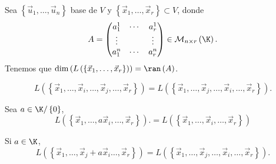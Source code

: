 Sea $\displaystyle \left\{ \vec{u}_{1}, \ldots, \vec{u}_{n}\right\}  $ base de $\displaystyle V $ y $\displaystyle \left\{ \vec{x}_{1}, \ldots, \vec{x}_{r}\right\} \subset V $, donde 
\[A = \begin{pmatrix} a^{1}_{1} & \cdots & a^{1}_{r} \\
\vdots & & \vdots \\
a^{n}_{1} & \cdots & a^{n}_{r}\end{pmatrix} \in \mathcal{M}_{n \times r}\left(\K\right).\]
Tenemos que $\displaystyle \dim\left(L \left( \left\{ \vec{x}_{1}, \ldots, \vec{x}_{r}\right\} \right)\right) = \ran\left(A\right)$. 
\begin{fprop}[]
\normalfont 
\[L\left( \left\{ \vec{x}_{1}, \ldots, \vec{x}_{i}, \ldots, \vec{x}_{j}, \ldots, \vec{x}_{r}\right\} \right) = L\left( \left\{ \vec{x}_{1}, \ldots, \vec{x}_{j}, \ldots, \vec{x}_{i}, \ldots, \vec{x}_{r}\right\} \right) .\]
\end{fprop}

\begin{fprop}[]
	\normalfont Sea $\displaystyle a \in \K/ \left\{ 0\right\}  $, 
	\[ L\left( \left\{ \vec{x}_{1}, \ldots, a\vec{x}_{i}, \ldots, \vec{x}_{r}\right\} \right).= L\left( \left\{ \vec{x}_{1},\ldots, \vec{x}_{i}, \ldots, \vec{x}_{r}\right\} \right)\]
\end{fprop}

\begin{fprop}[]
\normalfont Si $\displaystyle a \in \K $, 
\[L\left( \left\{ \vec{x}_{1}, \ldots, \vec{x}_{j}+a\vec{x}_{i} \ldots, \vec{x}_{r}\right\} \right) = L\left( \left\{ \vec{x}_{1}, \ldots, \vec{x}_{j}, \ldots, \vec{x}_{i}, \ldots, \vec{x}_{r}\right\} \right) .\]
\end{fprop}

